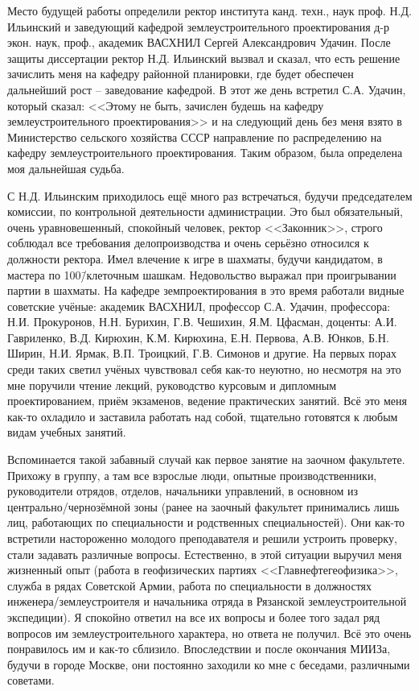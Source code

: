 Место будущей работы определили ректор института канд. техн., наук проф. Н.Д. Ильинский и заведующий кафедрой землеустроительного проектирования д-р экон. наук, проф., академик ВАСХНИЛ Сергей Александрович Удачин. После защиты диссертации ректор Н.Д. Ильинский вызвал и сказал, что есть решение зачислить меня на кафедру районной планировки, где будет обеспечен дальнейший рост \--- заведование кафедрой. В этот же день встретил С.А. Удачин, который сказал: <<Этому не быть, зачислен будешь на кафедру землеустроительного проектирования>> и на следующий день без меня взято в Министерство сельского хозяйства СССР направление по распределению на кафедру землеустроительного проектирования. Таким образом, была определена моя дальнейшая судьба. 

С Н.Д. Ильинским приходилось ещё много раз встречаться, будучи председателем комиссии, по контрольной деятельности администрации. Это был обязательный, очень уравновешенный, спокойный человек, ректор <<Законник>>, строго соблюдал все требования делопроизводства и очень серьёзно относился к должности ректора. Имел влечение к игре в шахматы, будучи кандидатом, в мастера по 100\=/клеточным шашкам. Недовольство выражал при проигрывании партии в шахматы. На кафедре земпроектирования в это время работали видные советские учёные: академик ВАСХНИЛ, профессор С.А. Удачин, профессора: Н.И. Прокуронов, Н.Н. Бурихин, Г.В. Чешихин, Я.М. Цфасман, доценты: А.И. Гавриленко, В.Д. Кирюхин, К.М. Кирюхина, Е.Н. Первова, А.В. Юнков, Б.Н. Ширин, Н.И. Ярмак, В.П. Троицкий, Г.В. Симонов и другие. На первых порах среди таких светил учёных чувствовал себя как-то неуютно, но несмотря на это мне поручили чтение лекций, руководство курсовым и дипломным проектированием, приём экзаменов, ведение практических занятий. Всё это меня как-то охладило и заставила работать над собой, тщательно готовятся к любым видам учебных занятий.

Вспоминается такой забавный случай как первое занятие на заочном факультете. Прихожу в группу, а там все взрослые люди, опытные производственники, руководители отрядов, отделов, начальники управлений, в основном из центрально\-/чернозёмной зоны (ранее на заочный факультет принимались лишь лиц, работающих по специальности и родственных специальностей). Они как-то встретили настороженно молодого преподавателя и решили устроить проверку, стали задавать различные вопросы. Естественно, в этой ситуации выручил меня жизненный опыт (работа в геофизических партиях <<Главнефтегеофизика>>, служба в рядах Советской Армии, работа по специальности в должностях инженера\-/землеустроителя и начальника отряда в Рязанской землеустроительной экспедиции). Я спокойно ответил на все их вопросы и более того задал ряд вопросов им землеустроительного характера, но ответа не получил. Всё это очень понравилось им и как-то сблизило. Впоследствии и после окончания МИИЗа, будучи в городе Москве, они постоянно заходили ко мне с беседами, различными советами. 

